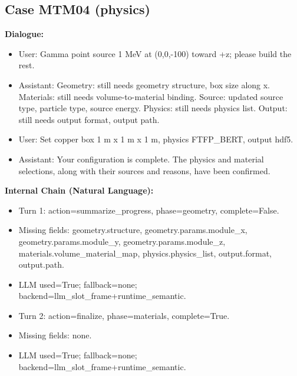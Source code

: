 \documentclass[11pt]{ctexart}
\begin{document}
\subsection{Case MTM04 (physics)}
\textbf{Dialogue:}
\begin{itemize}
\item User: Gamma point source 1 MeV at (0,0,-100) toward +z; please build the rest.
\item Assistant: Geometry: still needs geometry structure, box size along x. Materials: still needs volume-to-material binding. Source: updated source type, particle type, source energy. Physics: still needs physics list. Output: still needs output format, output path.
\item User: Set copper box 1 m x 1 m x 1 m, physics FTFP\_BERT, output hdf5.
\item Assistant: Your configuration is complete. The physics and material selections, along with their sources and reasons, have been confirmed.
\end{itemize}
\textbf{Internal Chain (Natural Language):}
\begin{itemize}
\item Turn 1: action=summarize\_progress, phase=geometry, complete=False.
\item Missing fields: geometry.structure, geometry.params.module\_x, geometry.params.module\_y, geometry.params.module\_z, materials.volume\_material\_map, physics.physics\_list, output.format, output.path.
\item LLM used=True; fallback=none; backend=llm\_slot\_frame+runtime\_semantic.
\item Turn 2: action=finalize, phase=materials, complete=True.
\item Missing fields: none.
\item LLM used=True; fallback=none; backend=llm\_slot\_frame+runtime\_semantic.
\end{itemize}
\end{document}
